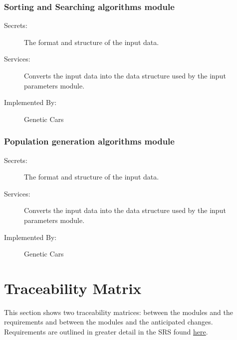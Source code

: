 \documentclass[12pt, titlepage]{article}
\begin{document}
\subsubsection{Sorting and Searching algorithms module}

\begin{description}
\item[Secrets:]The format and structure of the input data.
\item[Services:]Converts the input data into the data structure used by the
  input parameters module.
\item[Implemented By:] Genetic Cars
\end{description}

\subsubsection{Population generation algorithms module}

\begin{description}
\item[Secrets:]The format and structure of the input data.
\item[Services:]Converts the input data into the data structure used by the
  input parameters module.
\item[Implemented By:] Genetic Cars
\end{description}

\section{Traceability Matrix} \label{SecTM}

This section shows two traceability matrices: between the modules and the
requirements and between the modules and the anticipated changes. Requirements are outlined in greater detail in the SRS found \href{https://gitlab.cas.mcmaster.ca/linkk4/GrateBox/tree/master/Doc/SRS}{here}.
\end{document}
